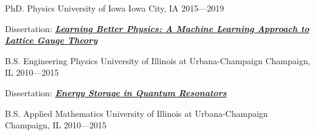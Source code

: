 % 
%
\begin{cventries}

  \cventry%
  {PhD. Physics}
  {University of Iowa}
  {Iowa City, IA}
  {2015---2019}
  {
    \begin{cvitems}
    \item {Dissertation: \href{https://ir.uiowa.edu/etd/6944/}{\textbf{\textit{Learning Better Physics: A Machine Learning
      Approach to Lattice Gauge Theory}}}}
    \end{cvitems}
  }

  \cventry
  {B.S. Engineering Physics}
  {University of Illinois at Urbana-Champaign}
  {Champaign, IL}
  {2010---2015}
  {
    \begin{cvitems}
    \item{Dissertation: \href{https://aip.scitation.org/doi/10.1063/1.5009698}{\textbf{\textit{Energy Storage in Quantum
      Resonators}}}}
    \end{cvitems}
  }

  \cventry
  {B.S. Applied Mathematics}
  {University of Illinois at Urbana-Champaign}
  {Champaign, IL}
  {2010---2015}
  {
    \begin{cvitems}
    \end{cvitems}
  }

\end{cventries}
